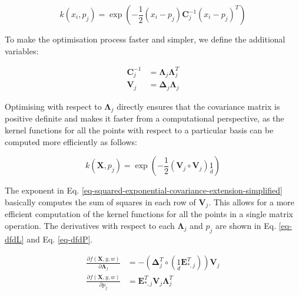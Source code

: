 \documentclass[useAMS,usenatbib,fleqn]{mn2e}
\newcommand{\bm}[1]{\mathbf{#1} }
\begin{document}
\begin{equation}
\label{eq-squared-exponential-covariance-extension}
k(x_{i},p_{j}) = \exp{\left(-\frac{1}{2}\left(x_{i}-p_{j}\right)\bm{C}_{j}^{-1}\left(x_{i}-p_{j}\right)^{T}\right)}
\end{equation}

To make the optimisation process faster and simpler, we define the additional variables:

\begin{subequations}
\begin{align} 
\label{eq-Cinv}
\bm{C}_{j}^{-1} &= \bm{\Lambda}_{j}\bm{\Lambda}_{j}^{T}\\
\label{eq-V_j}
\bm{V}_{j} &= \bm{\Delta}_{j}\bm{\Lambda}_{j}
\end{align}
\end{subequations}

Optimising with respect to $\bm{\Lambda}_{j}$ directly ensures that the covariance matrix is positive definite and makes it faster from a computational perspective, as the kernel functions for all the points with respect to a particular basis can be computed more efficiently as follows:

\begin{equation}
\label{eq-squared-exponential-covariance-extension-simplified}
k(\bm{X},p_{j}) = \exp{\left(-\frac{1}{2}\left(\bm{V}_{j}\circ \bm{V}_{j}\right)\underset{d}{1}\right)}
\end{equation}

The exponent in Eq. \eqref{eq-squared-exponential-covariance-extension-simplified} basically computes the sum of squares in each row of $\bm{V}_{j}$. This allows for a more efficient computation of the kernel functions for all the points in a single matrix operation. The derivatives with respect to each $\bm{\Lambda}_{j}$ and $p_{j}$ are shown in Eq. \eqref{eq-dfdL} and Eq. \eqref{eq-dfdP}.

\begin{subequations}
\begin{align} 
\label{eq-dfdL}
\frac{\partial f(\bm{X},y,w)}{\partial \bm{\Lambda}_{j}} &= -\left( \bm{\Delta}_{j}^{T}\circ \left(\underset{d}{1}\bm{E}_{*,j}^{T}\right) \right)\bm{V}_{j}\\
\label{eq-dfdP}
\frac{\partial f(\bm{X},y,w)}{\partial p_{j}} &= \bm{E}_{*,j}^{T}\bm{V}_{j}\bm{\Lambda}_{j}^{T}
\end{align}
\end{subequations}
\end{document}
